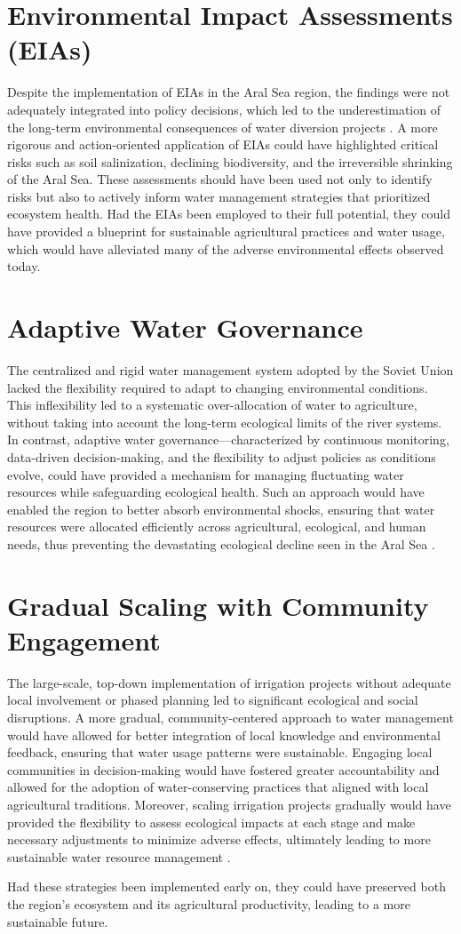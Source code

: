 \section{Environmental Impact Assessments (EIAs)}
Despite the implementation of EIAs in the Aral Sea region, the findings were not adequately integrated into policy decisions, which led to the underestimation of the long-term environmental consequences of water diversion projects \autocite{frederick1991disappearing}. A more rigorous and action-oriented application of EIAs could have highlighted critical risks such as soil salinization, declining biodiversity, and the irreversible shrinking of the Aral Sea. These assessments should have been used not only to identify risks but also to actively inform water management strategies that prioritized ecosystem health. Had the EIAs been employed to their full potential, they could have provided a blueprint for sustainable agricultural practices and water usage, which would have alleviated many of the adverse environmental effects
observed today.

\section{Adaptive Water Governance}
The centralized and rigid water management system adopted by the Soviet Union lacked the flexibility required to adapt to changing environmental conditions. This inflexibility led to a
systematic over-allocation of water to agriculture, without taking into account the long-term ecological limits of the river systems. In contrast, adaptive water governance—characterized
by continuous monitoring, data-driven decision-making, and the flexibility to adjust policies as conditions evolve, could have provided a mechanism for managing fluctuating water resources while safeguarding ecological health. Such an approach would have enabled the region to better absorb environmental shocks, ensuring that water resources were allocated efficiently across agricultural, ecological, and human needs, thus preventing the devastating ecological decline seen in the Aral Sea \autocite{sharipova2022adaptive}.

\section{Gradual Scaling with Community Engagement}
The large-scale, top-down implementation of irrigation projects without adequate local involvement or phased planning led to significant ecological and social disruptions. A more gradual, community-centered approach to water management would have allowed for better integration of local knowledge and environmental feedback, ensuring that water usage patterns were sustainable. Engaging local communities in decision-making would have fostered greater accountability and allowed for the adoption of water-conserving practices that aligned with local agricultural traditions. Moreover, scaling irrigation projects gradually would have provided the flexibility to assess ecological impacts at each stage and make necessary adjustments to minimize adverse effects, ultimately leading to more sustainable water resource management \autocite{micklin2007disaster}.


Had these strategies been implemented early on, they could have preserved both the region's ecosystem and its agricultural productivity, leading to a more sustainable future.